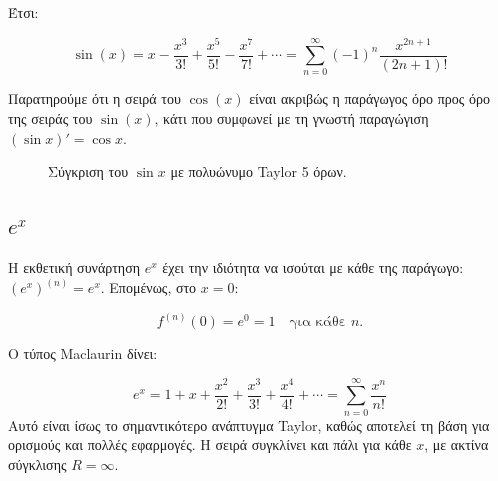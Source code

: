 \documentclass[
  a4paper,
  11pt,
]{article}
\begin{document}
Έτσι:

\[
\sin(x) = x - \frac{x^3}{3!} + \frac{x^5}{5!} - \frac{x^7}{7!} + \cdots = \sum_{n=0}^{\infty} (-1)^n \frac{x^{2n+1}}{(2n+1)!}
\]

Παρατηρούμε ότι η σειρά του \(\cos(x)\) είναι ακριβώς η παράγωγος όρο
προς όρο της σειράς του \(\sin(x)\), κάτι που συμφωνεί με τη γνωστή
παραγώγιση \((\sin x)' = \cos x\).

\begin{figure}[htbp]
\centering
{}
\caption{Σύγκριση του $\sin x$ με πολυώνυμο Taylor 5 όρων.}
\label{fig:sintaylor}
\par
\end{figure}

\subsection{\texorpdfstring{\(e^x\)}{e\^{}x}}\label{ex}

Η εκθετική συνάρτηση \(e^x\) έχει την ιδιότητα να ισούται με κάθε της
παράγωγο: \((e^x)^{(n)} = e^x\). Επομένως, στο \(x=0\):

\[
f^{(n)}(0) = e^0 = 1 \quad \text{για κάθε } n.
\]

Ο τύπος Maclaurin δίνει:

\[
e^x = 1 + x + \frac{x^2}{2!} + \frac{x^3}{3!} + \frac{x^4}{4!} + \cdots = \sum_{n=0}^{\infty} \frac{x^n}{n!}
\] Αυτό είναι ίσως το σημαντικότερο ανάπτυγμα Taylor, καθώς αποτελεί τη
βάση για ορισμούς και πολλές εφαρμογές. Η σειρά συγκλίνει και πάλι για
κάθε \(x\), με ακτίνα σύγκλισης \(R=\infty\).
\end{document}
